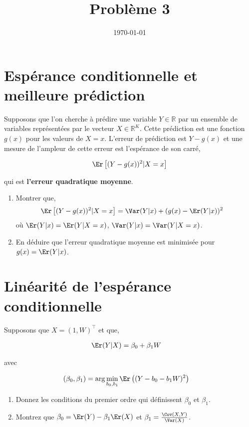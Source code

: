 
\title{Problème 3}
\date{\today}

\maketitle
\section{Espérance conditionnelle et meilleure prédiction}
Supposons que l'on cherche à prédire une variable $Y\in \mathbb{R}$
par un ensemble de variables représentées par le vecteur
$X\in\mathbb{R}^K$. Cette prédiction est une fonction $g(x)$ pour les
valeurs de $X=x$. L'erreur de prédiction est $Y-g(x)$ et une mesure
de l'ampleur de cette erreur est l'espérance de son
carré,

\begin{align*}
\Er\left[(Y-g(x))^2 | X = x\right]
\end{align*}

qui est \textbf{l'erreur quadratique moyenne}. 
\begin{enumerate}
\item Montrer que,
\begin{align*}
\Er\left[(Y-g(x))^2 | X = x\right] &= \Var(Y|x) +  (g(x) - \Er(Y|x))^2
\end{align*}
où $\Er(Y|x) = \Er(Y|X=x)$, $\Var(Y|x) = \Var(Y|X=x)$.
\item En déduire que l'erreur quadratique moyenne est minimisée pour
  $g(x) = \Er(Y|x)$.
\end{enumerate}

\section{Linéarité de l'espérance conditionnelle}
Supposons que $X=(1, W)^\top$ et que,

\begin{align*}
\Er(Y| X)  &= \beta_0 + \beta_1 W
\end{align*}

avec 

\begin{align*}
(\beta_0, \beta_1) &= \arg\min_{b_0, b_1}\Er\left((Y - b_0 - b_1W)^2\right)
\end{align*}


\begin{enumerate}
\item Donnez les conditions du premier ordre qui définissent $\beta_0$
  et $\beta_1$.
\item Montrez que $\beta_0 = \Er(Y)-\beta_1\Er(X)$ et $\beta_1 =
  \frac{\Cov(X, Y)}{\Var(X)}$.
\end{enumerate}

